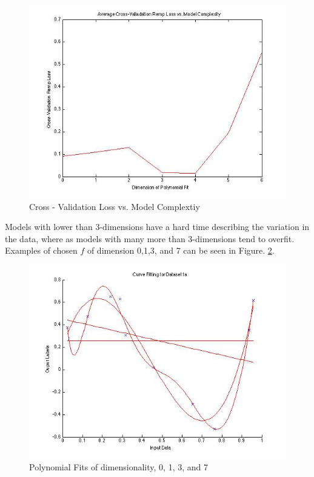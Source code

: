 \documentclass[paper=a4, fontsize=11pt]{scrartcl} %
\begin{document}
\begin{figure}
\centering
\includegraphics[scale=0.4]{Prob1_CrossValError.jpg}
\caption{Cross - Validation Loss vs. Model Complextiy}
\label{fig:Prob1_cross_val}
\end{figure}

Models with lower than 3-dimensions have a hard time describing the variation in the data, where as models with many more than 3-dimensions tend to overfit. Examples of chosen $f$ of dimension 0,1,3, and 7 can be seen in Figure. \ref{fig:manyplots}.

\begin{figure}
\centering
\includegraphics[scale=0.4]{manyplots.jpg}
\caption{Polynomial Fits of dimensionality, 0, 1, 3, and 7}
\label{fig:manyplots}
\end{figure}
\end{document}
